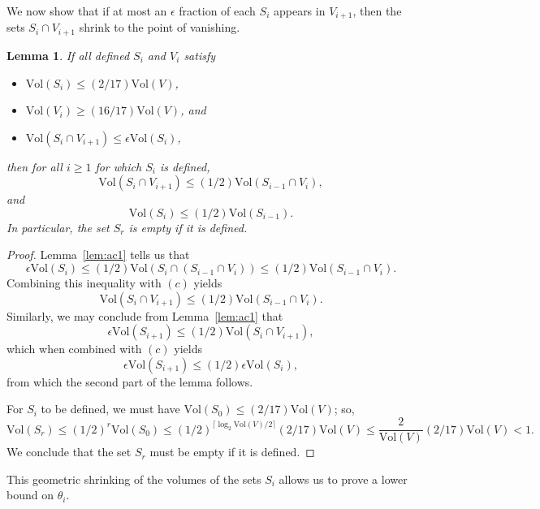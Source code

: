 \documentclass[11pt]{article}
\newtheorem{lemma}[theorem]{Lemma}
\def\intersect{\cap}
\def\intersect{\cap}
\newcommand{\ceiling}[1]{\lceil#1\rceil}
\def\vol#1{\mathrm{Vol}\left(#1  \right)}
\begin{document}
We now show that if at most an $\epsilon$ fraction of each $S_{i}$ appears in
  $V_{i+1}$, then the sets $S_{i} \intersect V_{i+1}$ shrink to the point of vanishing.

\begin{lemma}\label{lem:ac2}
If all defined $S_{i}$ and $V_{i}$ satisfy
\begin{itemize}
\item [(a)] $\vol{S_{i}} \leq (2/17) \vol{V}$, 
\item [(b)] $\vol{V_{i}} \geq (16/17) \vol{V}$, and
\item [(c)] $\vol{S_{i} \intersect V_{i+1}} \leq \epsilon \vol{S_{i}}$,
\end{itemize}
then
for all $i \geq 1$ for which $S_{i}$ is defined,
\[
  \vol{S_{i} \intersect V_{i+1}} \leq (1/2) \vol{S_{i-1} \intersect V_{i}},
\]
and
\[
  \vol{S_{i}} \leq (1/2) \vol{S_{i-1}}.
\]
In particular, the set $S_{r}$ is empty if it is defined.
\end{lemma}
\begin{proof}
Lemma~\ref{lem:ac1} tells us that
\[
  \epsilon \vol{S_{i}} 
  \leq (1/2) \vol{S_{i} \intersect (S_{i-1} \intersect V_{i})}
  \leq (1/2) \vol{ S_{i-1} \intersect V_{i}}.
\]
Combining this inequality with $(c)$ yields
\[
  \vol{S_{i} \intersect V_{i+1}} \leq (1/2) \vol{S_{i-1} \intersect V_{i}}.
\]
Similarly, we may conclude from Lemma~\ref{lem:ac1} that
\[
  \epsilon \vol{S_{i+1}} \leq (1/2) \vol{S_{i} \intersect V_{i+1}},
\]
which when combined with $(c)$ yields
\[
  \epsilon \vol{S_{i+1}} \leq (1/2) \epsilon \vol{S_{i}},
\]
from which the second part of the lemma follows.

For $S_{i}$ to be defined, we must have $\vol{S_{0}} \leq (2/17) \vol{V}$;
  so,
\[
\vol{S_{r}} \leq (1/2)^{r} \vol{S_{0}} 
  \leq (1/2)^{\ceiling{\log_{2} \vol{V}/2 }} (2/17) \vol{V}
  \leq \frac{2}{\vol{V}} (2/17) \vol{V} < 1.
\]
We conclude that the set $S_{r}$ must be empty if it is defined.
\end{proof}

This geometric shrinking of the volumes of the sets $S_{i}$ allows
  us to prove a lower bound on $\theta_{i}$.
\end{document}
